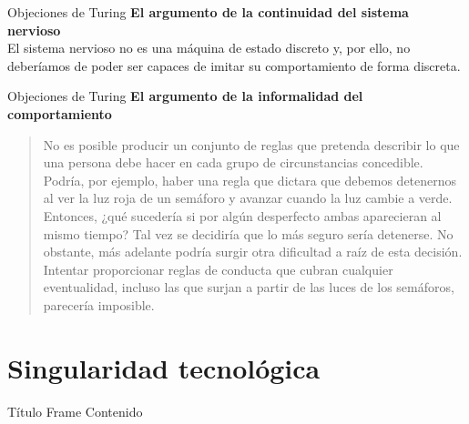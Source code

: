 \documentclass{beamer}
\begin{document}
\begin{frame}{Objeciones de Turing}
\textbf{El argumento de la continuidad del sistema nervioso}\\
El sistema nervioso no es una máquina de estado discreto y, por ello, no deberíamos de poder ser capaces de imitar su comportamiento de forma discreta.

\end{frame}

\begin{frame}{Objeciones de Turing}
\textbf{El argumento de la informalidad del comportamiento}
\begin{quote}\small No es posible producir un conjunto de reglas que pretenda describir lo que una persona debe hacer en cada grupo de circunstancias concedible. Podría, por ejemplo, haber una regla que dictara que debemos detenernos al ver la luz roja de un semáforo y avanzar cuando la luz cambie a verde. Entonces, ¿qué sucedería si por algún desperfecto ambas aparecieran al mismo tiempo? Tal vez se decidiría que lo más seguro sería detenerse. No obstante, más adelante podría surgir otra dificultad a raíz de esta decisión. Intentar proporcionar reglas de conducta que cubran cualquier eventualidad, incluso las que surjan a partir de las luces de los semáforos, parecería imposible.
\end{quote}
\end{frame}

\section{Singularidad tecnológica}
\begin{frame}{Título Frame}
Contenido
\end{frame}
\end{document}

